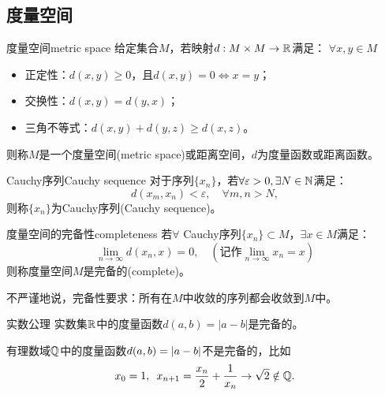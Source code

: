 \subsection{度量空间}

\begin{definition}
    {度量空间}{metric space}
    给定集合$M$，若映射$d:M \times M \to \mathbb{R}$满足：
    $\forall x,y \in M$
    \begin{itemize}
        \item 正定性：$d(x,y) \geq 0$，且$d(x,y) = 0 \iff x = y$；
        \item 交换性：$d(x,y) = d(y,x)$；
        \item 三角不等式：$d(x,y) + d(y,z) \geq d(x,z)$。
    \end{itemize}
    则称$M$是一个度量空间(metric space)或距离空间，$d$为度量函数或距离函数。
\end{definition}

\begin{definition}
    {Cauchy序列}{Cauchy sequence}
    对于序列$\{x_n\}$，若$\forall\varepsilon > 0,\exists N \in \mathbb{N}$满足：
    \begin{equation}
        d(x_m,x_n) < \varepsilon,\quad\forall m,n > N,
    \end{equation}
    则称$\{x_n\}$为Cauchy序列(Cauchy sequence)。
\end{definition}

\begin{definition}
    {度量空间的完备性}{completeness}
    若$\forall$ Cauchy序列$\{x_n\} \subset M$，$\exists x \in M$满足：
    \begin{equation}\label{eq:na-metric-convergence}
        \lim_{n\to\infty}d(x_n,x) = 0,\quad(\text{记作}\lim_{n\to\infty}x_n = x)
    \end{equation}
    则称度量空间$M$是完备的(complete)。
\end{definition}

\begin{remark}
    不严谨地说，完备性要求：所有在$M$中收敛的序列都会收敛到$M$中。%
\end{remark}

\begin{example}
    {实数公理}{}
    实数集$\mathbb{R}$中的度量函数$d(a,b) = |a - b|$是完备的。
\end{example}

\begin{remark}
    有理数域$\mathbb{Q}$中的度量函数$d(a,b) = \lvert a - b\rvert$不是完备的，比如
    \[
        x_0 = 1,\enspace x_{n+1} = \frac{x_n}2 + \frac1{x_n} \to \sqrt2 \notin \mathbb{Q}.
    \]
\end{remark}

